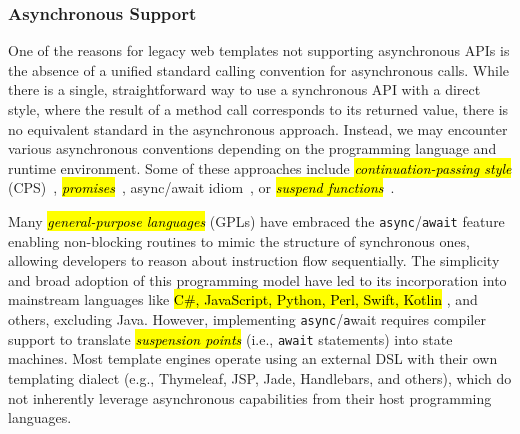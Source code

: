 \documentclass[software,article,accept,pdftex,moreauthors]{Definitions/mdpi}
\begin{document}

\subsubsection{Asynchronous Support}
\label{sec:async-support}

One of the reasons for legacy web templates not supporting asynchronous APIs is
the absence of a unified standard calling convention for asynchronous calls.
While there is a single, straightforward way to use a synchronous API with a
direct style, where the result of a method call corresponds to its returned
value, there is no equivalent standard in the asynchronous approach. Instead,
we may encounter various asynchronous conventions depending on the programming
language and runtime environment. Some of these approaches include
\emph{\hl{continuation-passing style}} (CPS)~\cite{scheme},
\textit{\hl{promises}}~\cite{promise}, async/await idiom~\cite{async_await},
or \textit{\hl{suspend functions}}~\cite{elizarov2021coroutines}.

Many \textit{\hl{general-purpose languages}} (GPLs) have embraced the
\texttt{async}/\texttt{await} feature~\cite{async_await} enabling non-blocking
routines to mimic the structure of synchronous ones, allowing developers to
reason about instruction flow sequentially. The simplicity and broad adoption
of this programming model have led to its incorporation into mainstream
languages like \hl{C\#, JavaScript, Python, Perl, Swift, Kotlin} %
, and others,
excluding Java. However, implementing \texttt{async}/\texttt{a}wait requires
compiler support to translate \textit{\hl{suspension points}} (i.e., \texttt{await}
statements) into state machines. Most template engines operate using an
external DSL with their own templating dialect (e.g., Thymeleaf, JSP, Jade,
Handlebars, and others), which do not inherently leverage asynchronous
capabilities from their host programming languages.
\end{document}
